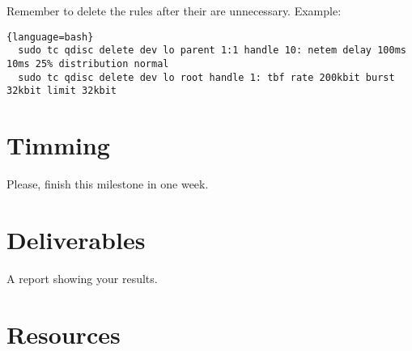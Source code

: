 Remember to delete the rules after their are unnecessary. Example:

\begin{lstlisting}{language=bash}
  sudo tc qdisc delete dev lo parent 1:1 handle 10: netem delay 100ms 10ms 25% distribution normal
  sudo tc qdisc delete dev lo root handle 1: tbf rate 200kbit burst 32kbit limit 32kbit
\end{lstlisting}

\section{Timming}

Please, finish this milestone in one week.

\section{Deliverables}

A report showing your results.

\section{Resources}


